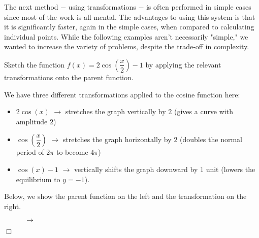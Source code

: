 \documentclass[../book.tex]{subfiles}
\begin{document}
The next method $-$ using transformations $-$ is often performed in simple cases since most of the work is all mental. The advantages to using this system is that it is significantly faster, again in the simple cases, when compared to calculating individual points. While the following examples aren't necessarily "simple," we wanted to increase the variety of problems, despite the trade-off in complexity.
\begin{example}
Sketch the function $f(x)=2\cos\left(\dfrac{x}{2}\right)-1$ by applying the relevant transformations onto the parent function.
\end{example}
\begin{solution}
We have three different transformations applied to the cosine function here: \begin{itemize}
    \item $2\cos(x)$ $\longrightarrow$ stretches the graph vertically by $2$ (gives a curve with amplitude $2$)
    \item $\cos\left(\dfrac{x}{2}\right)$ $\longrightarrow$ stretches the graph horizontally by $2$ (doubles the normal period of $2\pi$ to become $4\pi$)
    \item $\cos(x)-1$ $\longrightarrow$ vertically shifts the graph downward by $1$ unit (lowers the equilibrium to $y=-1$).
\end{itemize}
Below, we show the parent function on the left and the transformation on the right.
\begin{figure}[!ht]
    \centering
      $\to$ 
\end{figure} $\Box$
\end{solution}
\end{document}
